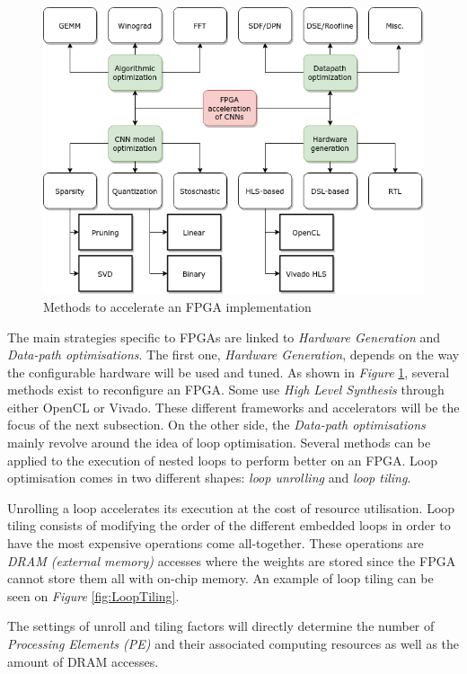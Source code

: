 \begin{figure}[htbp]
	\centering
		\includegraphics[width=.75\textwidth]{Figures/InferenceOpt1.png}
	\caption[Inference Optimisations]{Methods to accelerate an FPGA implementation \cite{Abdelouahab2018}}
	\label{fig:InferenceOpt}
\end{figure}

The main strategies specific to FPGAs are linked to \emph{Hardware Generation} and \emph{Data-path optimisations}. The first one, \emph{Hardware Generation}, depends on the way the configurable hardware will be used and tuned. As shown in \emph{Figure} \ref{fig:InferenceOpt}, several methods exist to reconfigure an FPGA. Some use \emph{High Level Synthesis} through either OpenCL or Vivado. These different frameworks and accelerators will be the focus of the next subsection. On the other side, the \emph{Data-path optimisations} mainly revolve around the idea of loop optimisation. Several methods can be applied to the execution of nested loops to perform better on an FPGA. Loop optimisation comes in two different shapes: \emph{loop unrolling} and \emph{loop tiling}.

Unrolling a loop accelerates its execution at the cost of resource utilisation. Loop tiling consists of modifying the order of the different embedded loops in order to have the most expensive operations come all-together. These operations are \emph{DRAM (external memory)} accesses where the weights are stored since the FPGA cannot store them all with on-chip memory. An example of loop tiling can be seen on \emph{Figure} \ref{fig:LoopTiling}.

The settings of unroll and tiling factors will directly determine the number of \emph{Processing Elements (PE)} and their associated computing resources as well as the amount of DRAM accesses.

